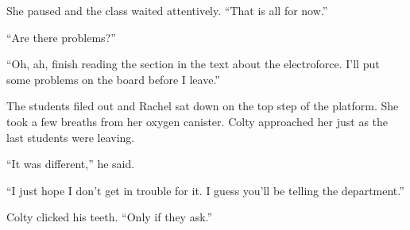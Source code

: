 She paused and the class waited attentively. ``That is all for now.''

``Are there problems?''

``Oh, ah, finish reading the section in the text about the electroforce. I'll put some problems
on the board before I leave.''

The students filed out and Rachel sat down on the top step of the platform. She took a few
breaths from her oxygen canister. Colty approached her just as the last students were leaving.

``It was different,'' he said.

``I just hope I don't get in trouble for it. I guess you'll be telling the department.''

Colty clicked his teeth. ``Only if they ask.''
